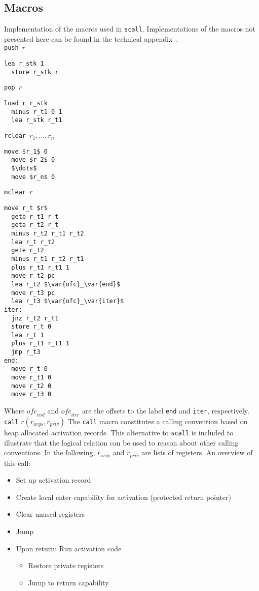 \documentclass[format=acmsmall, review=true, screen=true]{acmart}
\newcommand{\var}[1]{\mathit{#1}}
\begin{document}
\subsection{Macros}
\label{app:macros}
Implementation of the macros used in \texttt{scall}. Implementations of the
macros not presented here can be found in the technical
appendix~\citep{technical_appendix}.\\
\texttt{push $r$}
\begin{lstlisting}[xleftmargin=0.4cm]
  lea r_stk 1
  store r_stk r
\end{lstlisting}
\texttt{pop $r$}
\begin{lstlisting}[xleftmargin=0.4cm]
  load r r_stk
  minus r_t1 0 1
  lea r_stk r_t1
\end{lstlisting}
\texttt{rclear $r_1,\dots, r_n$}
\begin{lstlisting}[xleftmargin=0.4cm]
  move $r_1$ 0
  move $r_2$ 0
  $\dots$
  move $r_n$ 0
\end{lstlisting}
\texttt{mclear $r$}
\begin{lstlisting}[xleftmargin=0.4cm]
  move r_t $r$
  getb r_t1 r_t
  geta r_t2 r_t
  minus r_t2 r_t1 r_t2
  lea r_t r_t2
  gete r_t2
  minus r_t1 r_t2 r_t1
  plus r_t1 r_t1 1
  move r_t2 pc
  lea r_t2 $\var{ofc}_\var{end}$ 
  move r_t3 pc
  lea r_t3 $\var{ofc}_\var{iter}$
iter:
  jnz r_t2 r_t1
  store r_t 0
  lea r_t 1
  plus r_t1 r_t1 1
  jmp r_t3
end:
  move r_t 0
  move r_t1 0
  move r_t2 0
  move r_t3 0
\end{lstlisting}
Where $\var{ofc}_\var{end}$ and $\var{ofc}_\var{iter}$ are the offsets to the label \texttt{end} %
and \texttt{iter}, %
respectively.
\newline\newline
\texttt{call} $r(\bar{r}_{\var{args}},\bar{r}_{\var{priv}})$
\newline
The \texttt{call} macro constitutes a calling convention based on heap allocated activation records.
This alternative to \texttt{scall} is included to illustrate that the logical relation can be used to reason about other calling conventions.
In the following, $\bar{r}_{\var{args}}$ and $\bar{r}_{\var{priv}}$ are lists of registers. An overview of this call:
\begin{itemize}
\item Set up activation record
\item Create local enter capability for activation (protected return pointer)
\item Clear unused registers
\item Jump
\item Upon return: Run activation code
  \begin{itemize}
  \item Restore private registers
  \item Jump to return capability
  \end{itemize}
\end{itemize}
\end{document}
